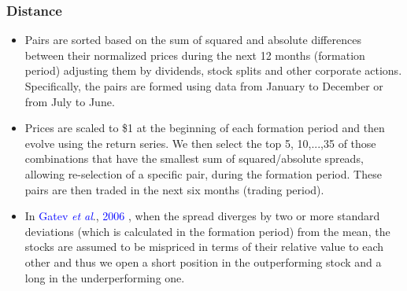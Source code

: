 \documentclass[pdf,9pt,xcolor=dvipsnames,hide notes]{beamer}
\begin{document}
\begin{frame}[label=frame2c]
\frametitle{Distance}

\begin{itemize}
\justifying
\item  Pairs are sorted based on the sum of squared and absolute differences between their normalized prices during the next 12 months (formation period) adjusting them by dividends, stock splits and other corporate actions. Specifically, the pairs are formed using data from January to December or from July to June.

\vspace{0.3cm}

\item Prices are scaled to \$1 at the beginning of each formation period and then evolve using the return series. We then select the top 5, 10,...,35 of those combinations that have the smallest sum of squared/absolute spreads, allowing re-selection of a specific pair, during the formation period. These pairs are then traded in the next six months (trading period).

\vspace{0.6cm}

\item In \textcolor{blue}{Gatev \emph{et al}}., \textcolor{blue}{2006} , when the spread diverges by two or more standard deviations (which is calculated in the formation period) from the mean, the stocks are assumed to be mispriced in terms of their relative value to each other and thus we open a short position in the outperforming stock and a long in the underperforming one. 

\end{itemize}

\end{frame}
\end{document}
